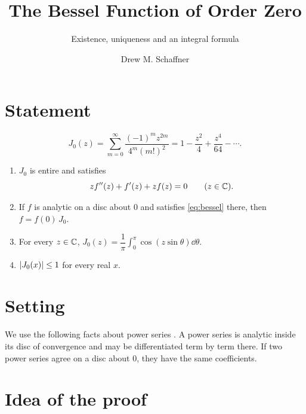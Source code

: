 \documentclass[11pt,a4paper]{article}
\title{The Bessel Function of Order Zero}
\subtitle{Existence, uniqueness and an integral formula}
\author{Drew M. Schaffner}
\begin{document}
\maketitle

\section{Statement}

\begin{definition}\label{def:j0}
  \begin{equation}\label{eq:series}
    J_0(z) = \sum_{m=0}^{\infty} \frac{(-1)^m z^{2m}}{4^m (m!)^2}
    = 1 - \frac{z^2}{4} + \frac{z^4}{64} - \dotsb .
  \end{equation}
\end{definition}

\begin{theorem}\label{thm:main}
  \begin{enumerate}[label=(\alph*)]
    \item $J_0$ is entire and satisfies
      \begin{equation}\label{eq:bessel}
        z f''(z) + f'(z) + z f(z) = 0 \qquad (z \in \mathbb{C}).
      \end{equation}
    \item If $f$ is analytic on a disc about $0$ and satisfies \eqref{eq:bessel}
      there, then $f = f(0)\, J_0$.
    \item For every $z \in \mathbb{C}$,
      $J_0(z) = \dfrac{1}{\pi} \displaystyle\int_0^\pi \cos(z \sin\theta) \dd\theta$.
    \item $\lvert J_0(x)\rvert \leq 1$ for every real $x$.
  \end{enumerate}
\end{theorem}

\section{Setting}

We use the following facts about power series \cite[ch.~5]{saff-snider}. A power
series is analytic inside its disc of convergence and may be differentiated term by
term there. If two power series agree on a disc about $0$, they have the same
coefficients.

\section{Idea of the proof}
\end{document}

